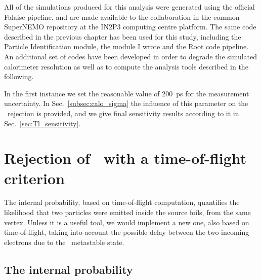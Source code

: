 All of the simulations produced for this analysis were generated using the official Falaise pipeline, and are made available to the collaboration in the common SuperNEMO repository at the IN$2$P$3$ computing centre platform.
The same code described in the previous chapter has been used for this study, including the Particle Identification module, the module I wrote and the Root code pipeline.
An additional set of codes have been developed in order to degrade the simulated calorimeter resolution as well as to compute the analysis tools described in the following.

In the first instance we set the reasonable value of $200$~ps for the measurement uncertainty.
In Sec.~\ref{subsec:calo_sigma} the influence of this parameter on the \Tl\ rejection is provided, and we give final sensitivity results according to it in Sec.~\ref{sec:Tl_sensitivity}.


\section{Rejection of \Tl\ with a time-of-flight criterion}
\label{sec:Tl_TOF}


The internal probability, based on time-of-flight computation, quantifies the likelihood that two particles were emitted inside the source foils, from the same vertex.
Unless it is a useful tool, we would implement a new one, also based on time-of-flight, taking into account the possible delay between the two incoming electrons due to the \Pb\ metastable state.


\subsection{The internal probability}

